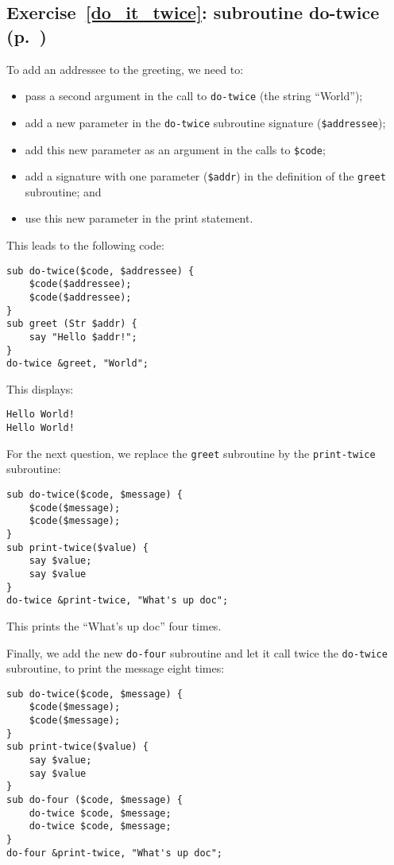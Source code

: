 \subsection{Exercise~\ref{do_it_twice}: subroutine do-twice (p.~\pageref{do_it_twice})}
\label{sol_do_it_twice}

To add an addressee to the greeting, we need to:
\begin{itemize}
\item pass a second argument in the call to 
{\tt do-twice} (the string ``World'');
\item add a new parameter in the {\tt do-twice} subroutine 
signature (\verb'$addressee');
\item add this new parameter as an argument in the calls 
to \verb'$code';
\item add a signature with one parameter (\verb'$addr') in 
the definition of the {\tt greet} subroutine; and 
\item use this new parameter in the print statement.
\end{itemize} 

This leads to the following code:

\begin{verbatim}
sub do-twice($code, $addressee) {
    $code($addressee); 
    $code($addressee);
}
sub greet (Str $addr) {
    say "Hello $addr!";
}
do-twice &greet, "World";
\end{verbatim}

This displays:

\begin{verbatim}
Hello World!
Hello World!
\end{verbatim}

For the next question, we replace the {\tt greet} subroutine 
by the {\tt print-twice} subroutine:

\begin{verbatim}
sub do-twice($code, $message) {
    $code($message); 
    $code($message);
}
sub print-twice($value) {
    say $value;
    say $value
}
do-twice &print-twice, "What's up doc";
\end{verbatim}

This prints the ``What's up doc'' four times.

Finally, we add the new {\tt do-four} subroutine and let 
it call twice the {\tt do-twice} subroutine, to print the 
message eight times:

\begin{verbatim}
sub do-twice($code, $message) {
    $code($message); 
    $code($message);
}
sub print-twice($value) {
    say $value;
    say $value
}
sub do-four ($code, $message) {
    do-twice $code, $message;
    do-twice $code, $message;
}
do-four &print-twice, "What's up doc";
\end{verbatim}

